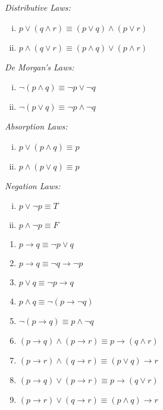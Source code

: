 \documentclass[a4paper,8pt]{article}
\begin{document}
\begin{outline}
\begin{enumerate}
\begin{minipage}[t]{.5\textwidth}
        \item \textit{Distributive Laws:}
          \begin{enumerate}[i.]
            \item \(p \vee (q \wedge r) \equiv (p \vee q) \wedge (p \vee r)\)
            \item \(p \wedge (q \vee r) \equiv (p \wedge q) \vee (p \wedge r)\)
          \end{enumerate}
        \item \textit{De Morgan's Laws:}
          \begin{enumerate}[i.]
            \item \(\neg(p \wedge q) \equiv \neg p \vee \neg q\)
            \item \(\neg(p \vee q) \equiv \neg p \wedge \neg q\)
          \end{enumerate}
        \item \textit{Absorption Laws:}
          \begin{enumerate}[i.]
            \item \(p \vee (p \wedge q) \equiv p\)
            \item \(p \wedge (p \vee q) \equiv p\)
          \end{enumerate}
        \item \textit{Negation Laws:}
          \begin{enumerate}[i.]
            \item \(p \vee \neg{p} \equiv T\)
            \item \(p \wedge \neg{p} \equiv F\)
          \end{enumerate}
      \end{minipage}
    \end{enumerate}

    \begin{enumerate}
      \item \(p \rightarrow q \equiv \neg{p} \vee q\)
      \item \(p \rightarrow q \equiv \neg{q} \rightarrow \neg{p}\)
      \item \(p \vee q \equiv \neg p \rightarrow q\)
      \item \(p \wedge q \equiv \neg(p \rightarrow \neg q)\)
      \item \(\neg(p \rightarrow q) \equiv p \wedge \neg q\)
      \item \((p \rightarrow q) \wedge (p \rightarrow r) \equiv p \rightarrow (q \wedge r)\)
      \item \((p \rightarrow r) \wedge (q \rightarrow r) \equiv (p \vee q) \rightarrow r\)
      \item \((p \rightarrow q) \vee (p \rightarrow r) \equiv p \rightarrow (q \vee r)\)
      \item \((p \rightarrow r) \vee (q \rightarrow r) \equiv (p \wedge q) \rightarrow r\)
    \end{enumerate}


\end{outline}
\end{document}
